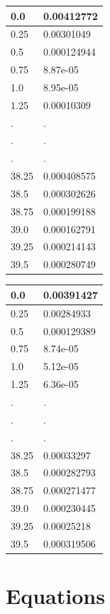 \documentclass[a4paper, 12pt]{article}
\begin{document}
\begin{center}
\begin{tabular}{|l|l|}\hline
0.0&0.00412772\\ \hline
0.25&0.00301049\\ \hline
0.5&0.000124944\\ \hline
0.75&8.87e-05\\ \hline
1.0&8.95e-05\\ \hline
1.25&0.00010309\\ \hline
.&.\\
.&.\\
.&.\\
38.25&0.000408575\\ \hline
38.5&0.000302626\\ \hline
38.75&0.000199188\\ \hline
39.0&0.000162791\\ \hline
39.25&0.000214143\\ \hline
39.5&0.000280749\\ \hline
	\end{tabular}
\end{center}
\begin{center}
\begin{tabular}{|l|l|}\hline
0.0&0.00391427\\ \hline
0.25&0.00284933\\ \hline
0.5&0.000129389\\ \hline
0.75&8.74e-05\\ \hline
1.0&5.12e-05\\ \hline
1.25&6.36e-05\\ \hline
.&.\\
.&.\\
.&.\\
38.25&0.00033297\\ \hline
38.5&0.000282793\\ \hline
38.75&0.000271477\\ \hline
39.0&0.000230445\\ \hline
39.25&0.00025218\\ \hline
39.5&0.000319506\\ \hline
	\end{tabular}
\end{center}
\section{Equations}
\end{document}
